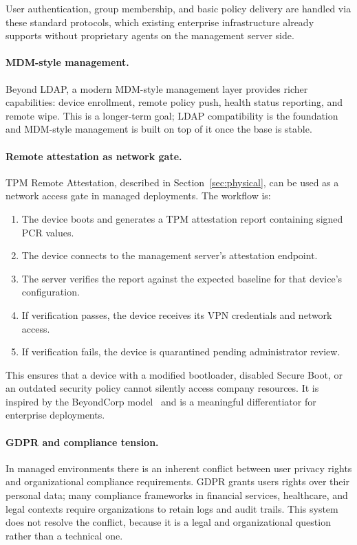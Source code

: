 User authentication, group membership, and basic policy delivery are handled
via these standard protocols, which existing enterprise infrastructure already
supports without proprietary agents on the management server side.

\paragraph{MDM-style management.}
Beyond LDAP, a modern MDM-style management layer provides richer capabilities:
device enrollment, remote policy push, health status reporting, and remote
wipe. This is a longer-term goal; LDAP compatibility is the foundation and
MDM-style management is built on top of it once the base is stable.

\paragraph{Remote attestation as network gate.}
TPM Remote Attestation, described in Section~\ref{sec:physical}, can be used
as a network access gate in managed deployments. The workflow is:

\begin{enumerate}
\item The device boots and generates a TPM attestation report containing signed
  PCR values.
\item The device connects to the management server's attestation endpoint.
\item The server verifies the report against the expected baseline for that
  device's configuration.
\item If verification passes, the device receives its VPN credentials and
  network access.
\item If verification fails, the device is quarantined pending administrator
  review.
\end{enumerate}

This ensures that a device with a modified bootloader, disabled Secure Boot, or
an outdated security policy cannot silently access company resources. It is
inspired by the BeyondCorp model~\cite{beyondcorp} and is a meaningful
differentiator for enterprise deployments.

\paragraph{GDPR and compliance tension.}
In managed environments there is an inherent conflict between user privacy
rights and organizational compliance requirements. GDPR grants users rights
over their personal data; many compliance frameworks in financial services,
healthcare, and legal contexts require organizations to retain logs and audit
trails. This system does not resolve the conflict, because it is a legal and
organizational question rather than a technical one.

